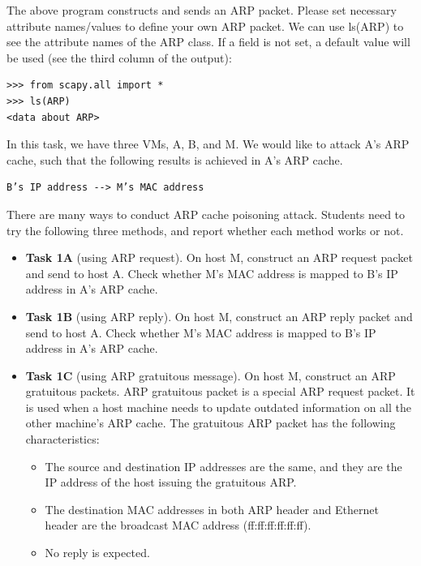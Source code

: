 \documentclass[12pt]{article}
\newcommand\tab[1][0.5cm]{\hspace*{#1}}
\begin{document}
\tab The above program constructs and sends an ARP packet. Please set necessary attribute names/values to
define your own ARP packet. We can use ls(ARP) to see the attribute names of the ARP class. If a field
is not set, a default value will be used (see the third column of the output):

\begin{verbatim}
>>> from scapy.all import *
>>> ls(ARP)
<data about ARP>
\end{verbatim}
In this task, we have three VMs, A, B, and M. We would like to attack A’s ARP cache, such that the
following results is achieved in A’s ARP cache.

\begin{verbatim}
B’s IP address --> M’s MAC address
\end{verbatim}
There are many ways to conduct ARP cache poisoning attack. Students need to try the following three
methods, and report whether each method works or not.

\begin{itemize}
	\item \textbf{Task 1A} (using ARP request). On host M, construct an ARP request packet and send to host A.
	Check whether M’s MAC address is mapped to B’s IP address in A’s ARP cache.
	\item \textbf{Task 1B} (using ARP reply). On host M, construct an ARP reply packet and send to host A. Check
	whether M’s MAC address is mapped to B’s IP address in A’s ARP cache.
	\item \textbf{Task 1C} (using ARP gratuitous message). On host M, construct an ARP gratuitous packets. ARP
	gratuitous packet is a special ARP request packet. It is used when a host machine needs to update
	outdated information on all the other machine’s ARP cache. The gratuitous ARP packet has the
	following characteristics:
	\begin{itemize} 
		\item The source and destination IP addresses are the same, and they are the IP address of the host
		issuing the gratuitous ARP.
		\item The destination MAC addresses in both ARP header and Ethernet header are the broadcast MAC
		address (ff:ff:ff:ff:ff:ff).
		\item No reply is expected.
		
	\end{itemize}
\end{itemize}
\end{document}
